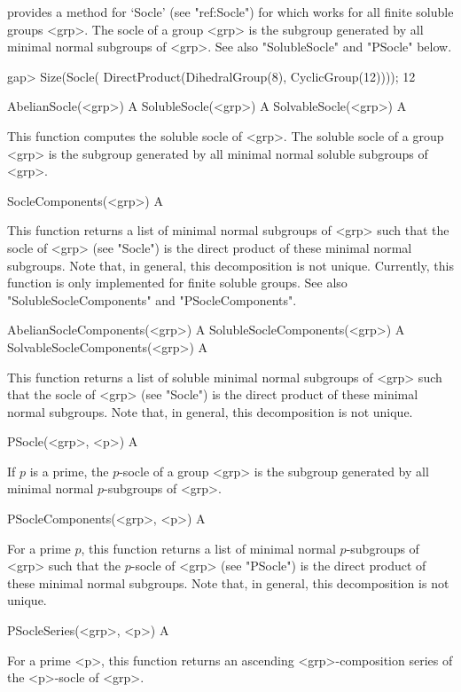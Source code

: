 {\CRISP} provides a method for `Socle' (see "ref:Socle") for which works for 
all finite soluble groups <grp>. The socle of a group <grp> is the subgroup 
generated by all minimal normal subgroups of <grp>. See also "SolubleSocle" and
"PSocle" below.

\beginexample
gap> Size(Socle( DirectProduct(DihedralGroup(8), CyclicGroup(12))));
12
\endexample

\>AbelianSocle(<grp>) A
\>SolubleSocle(<grp>) A
\>SolvableSocle(<grp>) A

This function computes the soluble socle of <grp>. The soluble socle of a group <grp> is the
subgroup  generated by all minimal normal soluble subgroups of <grp>.

\>SocleComponents(<grp>) A

This function returns a list of minimal normal subgroups of <grp> such 
that the socle of <grp> (see "Socle") is the direct product of these minimal normal
subgroups. Note that, in general, this decomposition is not unique. Currently,
this function is only implemented for finite soluble groups. See also 
"SolubleSocleComponents" and  "PSocleComponents".

\>AbelianSocleComponents(<grp>) A
\>SolubleSocleComponents(<grp>) A
\>SolvableSocleComponents(<grp>) A

This function returns a list of soluble minimal normal subgroups of <grp> such
that the socle of <grp> (see "Socle") is the direct product of these minimal normal
subgroups. Note that, in general, this decomposition is not unique.

\>PSocle(<grp>, <p>) A

If $p$ is a prime, the $p$-socle of a group <grp> is the subgroup 
generated by all minimal normal $p$-subgroups of <grp>.

\>PSocleComponents(<grp>, <p>) A

For a prime $p$, this function returns a list of minimal normal $p$-subgroups of <grp>
such  that the $p$-socle of <grp> (see "PSocle") is the direct product of these minimal normal
subgroups. Note that, in general, this decomposition is not unique.

\>PSocleSeries(<grp>, <p>) A

For a prime <p>, this function returns an ascending <grp>-composition series of the <p>-socle of <grp>.



